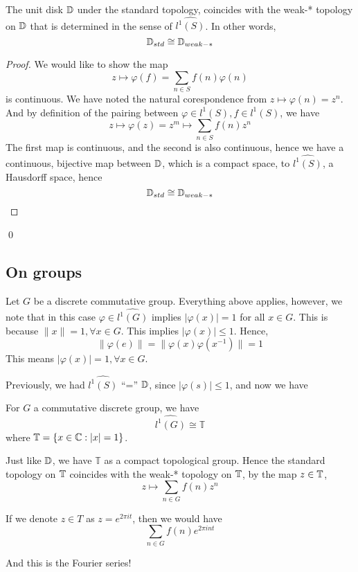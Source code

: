 \begin{proposition}
    The unit disk $\mathbb{D}$ under the standard topology, coincides with the weak-* topology on $\mathbb{D}$ that is determined in the sense of $\widehat{l^1(S)}$. In other words,
    \begin{equation*}
        \mathbb{D}_{std}\cong \mathbb{D}_{weak-*}
    \end{equation*}
\end{proposition}
\begin{proof}
    We would like to show the map
    \begin{equation*}
        z\mapsto\varphi(f)=\sum_{n\in S}f(n)\varphi(n)
    \end{equation*}
    is continuous. We have noted the natural corespondence from $z\mapsto \varphi(n)=z^n$. And by definition of the pairing between $\varphi\in l^1(S), f\in l^1(S)$, we have
    \begin{equation*}
        z\mapsto \varphi(z)=z^m\mapsto \sum_{n\in S}f(n)z^n
    \end{equation*}
    The first map is continuous, and the second is also continuous, hence we have a continuous, bijective map between $\mathbb{D}$, which is a compact space, to $\widehat{l^1(S)}$, a Hausdorff space, hence
    \begin{equation*}
        \mathbb{D}_{std}\cong\mathbb{D}_{weak-*}
    \end{equation*}
\end{proof}
\qed

\subsection{On groups}
Let $G$ be a discrete commutative group. Everything above applies, however, we note that in this case $\varphi\in\widehat{l^1(G)}$ implies $|\varphi(x)|=1$ for all $x\in G$.
This is because $\|x\|=1, \forall x\in G$. This implies $|\varphi(x)|\leq 1$. Hence,
\begin{equation*}
    \|\varphi(e)\|=\|\varphi(x)\varphi(x^{-1})\|=1
\end{equation*}
This means $|\varphi(x)|=1, \forall x\in G$.

Previously, we had $\widehat{l^1(S)}$ ``='' $\mathbb{D}$, since $|\varphi(s)|\leq 1$, and now we have
\begin{proposition}
    For $G$ a commutative discrete group, we have
    \begin{equation*}
        \widehat{l^1(G)}\cong \mathbb{T}
    \end{equation*}
    where $\mathbb{T}=\{x\in\mathbb{C}: |x|=1\}$.
\end{proposition}

Just like $\mathbb{D}$, we have $\mathbb{T}$ as a compact topological group. Hence the standard topology on $\mathbb{T}$ coincides with the weak-* topology on $\mathbb{T}$, by the map $z\in\mathbb{T}$,
\begin{equation*}
    z\mapsto \sum_{n\in G}f(n)z^n
\end{equation*}

If we denote $z\in T$ as $z=e^{2\pi it}$,
then we would have
\begin{equation*}
    \sum_{n\in G}f(n)e^{2\pi int}
\end{equation*}

And this is the Fourier series!


